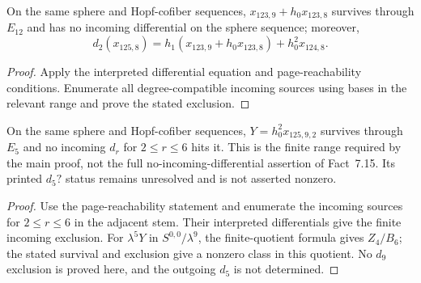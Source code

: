 \begin{proposition}
  \label{evidence:x_123_9}
  \notready
  On the same sphere and Hopf-cofiber sequences,
  $x_{123,9}+h_0x_{123,8}$ survives through $E_{12}$ and has no incoming
  differential on the sphere sequence; moreover,
  \[
    d_2(x_{125,8})=
      h_1(x_{123,9}+h_0x_{123,8})+h_0^2x_{124,8}.
  \]
\end{proposition}

\begin{proof}
  Apply the interpreted differential equation and page-reachability
  conditions. Enumerate all degree-compatible incoming sources using
  bases in the relevant range and prove the stated exclusion.
\end{proof}

\begin{proposition}
  \label{evidence:h_0_sq_mul_x_125_9_2}
  \notready
  On the same sphere and Hopf-cofiber sequences,
  $Y=h_0^2x_{125,9,2}$ survives through $E_5$ and no incoming
  $d_r$ for $2\le r\le6$ hits it. This is the finite range required by
  the main proof, not the full no-incoming-differential assertion of
  Fact~7.15. Its printed $d_5?$ status remains unresolved and is not
  asserted nonzero.
\end{proposition}

\begin{proof}
  Use the page-reachability statement and enumerate the incoming sources
  for $2\le r\le6$ in the adjacent stem. Their interpreted differentials
  give the finite incoming exclusion. For $\lambda^5Y$ in
  $S^{0,0}/\lambda^9$, the finite-quotient formula gives $Z_4/B_6$;
  the stated survival and exclusion give a nonzero class in this quotient.
  No $d_9$ exclusion is proved here, and the outgoing $d_5$ is not determined.
\end{proof}

